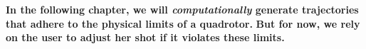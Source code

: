 \begin{tcolorbox}[before skip=20pt, after skip=20pt, sharp corners]
\begin{center}
\textbf{In the following chapter, we will \emph{computationally} generate trajectories that adhere to the physical limits of a quadrotor.}
\textbf{But for now, we rely on the user to adjust her shot if it violates these limits.}
\end{center}
\end{tcolorbox}

